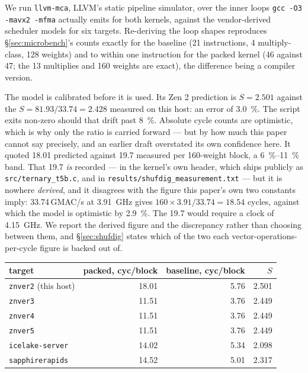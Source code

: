 \documentclass[11pt,a4paper]{article}
\newcommand{\code}[1]{\texttt{#1}}
\begin{document}
We run \code{llvm-mca}, LLVM's static pipeline simulator, over the inner loops
\code{gcc -O3 -mavx2 -mfma} actually emits for both kernels, against the
vendor-derived scheduler models for six targets. Re-deriving the loop shapes
reproduces \S\ref{sec:microbench}'s counts exactly for the baseline (21
instructions, 4 multiply-class, 128 weights) and to within one instruction for
the packed kernel (46 against 47; the 13 multiplies and 160 weights are exact),
the difference being a compiler version.

The model is calibrated before it is used. Its Zen 2 prediction is
$S=\num{2.501}$ against the $S=\num{81.93}/\num{33.74}=\num{2.428}$ measured on
this host: an error of \SI{3.0}{\percent}. The script exits non-zero should that
drift past \SI{8}{\percent}. Absolute cycle counts are optimistic, which is why only
the ratio is carried forward --- but by how much this paper cannot say
precisely, and an earlier draft overstated its own confidence here. It quoted
\num{18.01} predicted against \num{19.7} measured per 160-weight block, a
\SIrange{6}{11}{\percent} band. That \num{19.7} \emph{is} recorded --- in the
kernel's own header, which ships publicly as \code{src/ternary\_t5b.c}, and in
\code{results/shufdig\_measurement.txt} --- but it is nowhere \emph{derived},
and it disagrees with the figure this paper's own two constants imply:
\num{33.74}\,GMAC/s at
\SI{3.91}{\giga\hertz} gives $160\times\num{3.91}/\num{33.74}=\num{18.54}$
cycles, against which the model is optimistic by \SI{2.9}{\percent}. The
\num{19.7} would require a clock of \SI{4.15}{\giga\hertz}. We report the
derived figure and the discrepancy rather than choosing between them, and
\S\ref{sec:shufdig} states which of the two each vector-operations-per-cycle
figure is backed out of.

\begin{center}
\begin{tabular}{lrrr}
\toprule
target & packed, cyc/block & baseline, cyc/block & $S$ \\
\midrule
\code{znver2} (this host) & 18.01 & 5.76 & 2.501 \\
\code{znver3}             & 11.51 & 3.76 & 2.449 \\
\code{znver4}             & 11.51 & 3.76 & 2.449 \\
\code{znver5}             & 11.51 & 3.76 & 2.449 \\
\code{icelake-server}     & 14.02 & 5.34 & 2.098 \\
\code{sapphirerapids}     & 14.52 & 5.01 & 2.317 \\
\bottomrule
\end{tabular}
\end{center}
\end{document}
